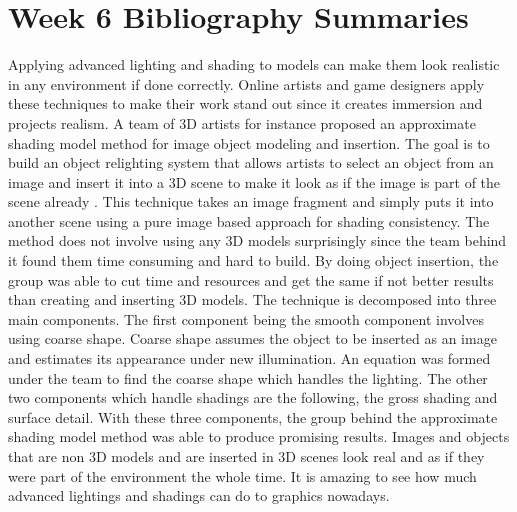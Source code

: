 \documentclass{article}
\begin{document}
\section{Week 6 Bibliography Summaries}

Applying advanced lighting and shading to models can make them look realistic in any environment if done correctly. Online artists and game designers apply these techniques to make their work stand out since it creates immersion and projects realism. A team of 3D artists for instance proposed an approximate shading model method for image object modeling and insertion. The goal is to build an object relighting system that allows artists to select an object from an image and insert it into a 3D scene to make it look as if the image is part of the scene already \cite{7299168}. This technique takes an image fragment and simply puts it into another scene using a pure image based approach for shading consistency. The method does not involve using any 3D models surprisingly since the team behind it found them time consuming and hard to build. By doing object insertion, the group was able to cut time and resources and get the same if not better results than creating and inserting 3D models. The technique is decomposed into three main components. The first component being the smooth component involves using coarse shape. Coarse shape assumes the object to be inserted as an image and estimates its appearance under new illumination. An equation was formed under the team to find the coarse shape which handles the lighting. The other two components which handle shadings are the following, the gross shading and surface detail. With these three components, the group behind the approximate shading model method was able to produce promising results. Images and objects that are non 3D models and are inserted in 3D scenes look real and as if they were part of the environment the whole time. It is amazing to see how much advanced lightings and shadings can do to graphics nowadays. 
	
\end{document}

